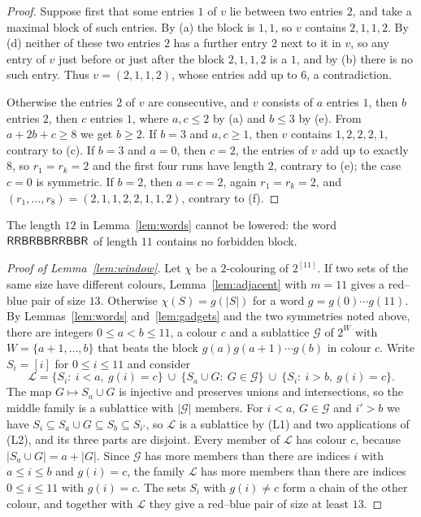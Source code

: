 \documentclass[11pt,reqno]{amsart}
\numberwithin{equation}{section}
\theoremstyle{plain}
\theoremstyle{definition}
\theoremstyle{remark}
\newcommand{\cL}{\mathcal{L}}
\newcommand{\w}[1]{\textsf{\upshape #1}}
\newcommand{\cG}{\mathcal{G}}
\begin{document}
\begin{proof}
Suppose first that some entries $1$ of $v$ lie between two entries $2$,
and take a maximal block of such entries. By (a) the block is $1,1$, so
$v$ contains $2,1,1,2$. By (d) neither of these two entries $2$ has a
further entry $2$ next to it in $v$, so any entry of $v$ just before or
just after the block $2,1,1,2$ is a $1$, and by (b) there is no such
entry. Thus $v=(2,1,1,2)$, whose entries add up to $6$, a contradiction.

Otherwise the entries $2$ of $v$ are consecutive, and $v$ consists of $a$
entries $1$, then $b$ entries $2$, then $c$ entries $1$, where $a,c\le2$
by (a) and $b\le3$ by (e). From $a+2b+c\ge8$ we get $b\ge2$. If $b=3$
and $a,c\ge1$, then $v$ contains $1,2,2,2,1$, contrary to (c). If $b=3$
and $a=0$, then $c=2$, the entries of $v$ add up to exactly $8$, so
$r_1=r_k=2$ and the first four runs have length $2$, contrary to (e); the
case $c=0$ is symmetric. If $b=2$, then $a=c=2$, again $r_1=r_k=2$, and
$(r_1,\dots,r_8)=(2,1,1,2,2,1,1,2)$, contrary to (f).
\end{proof}

The length $12$ in Lemma~\ref{lem:words} cannot be lowered: the word
$\w{RRBRBBRRBBR}$ of length $11$ contains no forbidden block.

\begin{proof}[Proof of Lemma~\ref{lem:window}]
Let $\chi$ be a $2$-colouring of $2^{[11]}$. If two sets of the same size
have different colours, Lemma~\ref{lem:adjacent} with $m=11$ gives a
red--blue pair of size $13$. Otherwise $\chi(S)=g(|S|)$ for a word
$g=g(0)\cdots g(11)$. By Lemmas~\ref{lem:words} and~\ref{lem:gadgets} and
the two symmetries noted above, there are integers $0\le a<b\le11$, a
colour $c$ and a sublattice $\cG$ of $2^{W}$ with $W=\{a+1,\dots,b\}$ that
beats the block $g(a)g(a+1)\cdots g(b)$ in colour $c$. Write $S_i=[i]$
for $0\le i\le11$ and consider
\[
\cL=\{S_i:\ i<a,\ g(i)=c\}\ \cup\ \{S_a\cup G:\ G\in\cG\}\ \cup\
\{S_i:\ i>b,\ g(i)=c\}.
\]
The map $G\mapsto S_a\cup G$ is injective and preserves unions and
intersections, so the middle family is a sublattice with $|\cG|$
members. For $i<a$, $G\in\cG$ and $i'>b$ we have $S_i\subseteq
S_a\cup G\subseteq S_b\subseteq S_{i'}$, so $\cL$ is a sublattice by (L1)
and two applications of (L2), and its three parts are disjoint. Every
member of $\cL$ has colour $c$, because $|S_a\cup G|=a+|G|$. Since $\cG$
has more members than there are indices $i$ with $a\le i\le b$ and
$g(i)=c$, the family $\cL$ has more members than there are indices
$0\le i\le11$ with $g(i)=c$. The sets $S_i$ with $g(i)\ne c$ form a chain
of the other colour, and together with $\cL$ they give a red--blue pair of
size at least $13$.
\end{proof}
\end{document}

